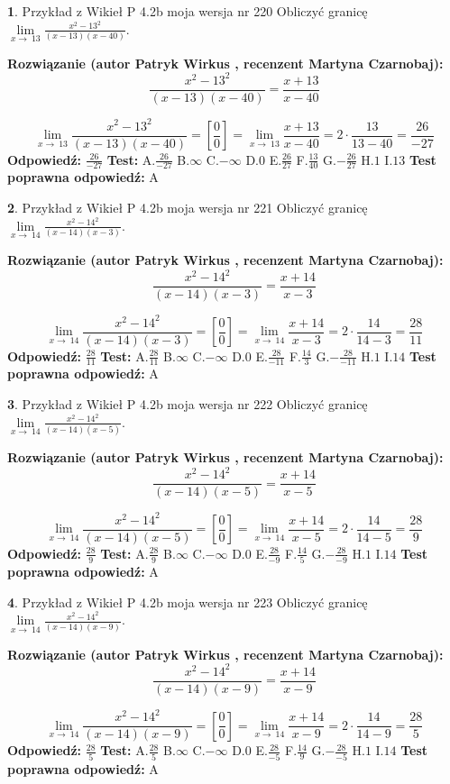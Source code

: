 \documentclass[12pt, a4paper]{article}
\theoremstyle{definition} %
\newtheorem{zad}{}
\newcommand{\zadStart}[1]{\begin{zad}#1\newline}
\newcommand{\zadStop}{\end{zad}}
\newcommand{\rozwStart}[2]{\noindent \textbf{Rozwiązanie (autor #1 , recenzent #2): }\newline}
\newcommand{\rozwStop}{\newline}
\newcommand{\odpStart}{\noindent \textbf{Odpowiedź:}\newline}
\newcommand{\odpStop}{\newline}
\newcommand{\testStart}{\noindent \textbf{Test:}\newline}
\newcommand{\testStop}{\newline}
\newcommand{\kluczStart}{\noindent \textbf{Test poprawna odpowiedź:}\newline}
\newcommand{\kluczStop}{\newline}
\begin{document}
\zadStart{Przykład z Wikieł P 4.2b moja wersja nr 220}
Obliczyć granicę $\lim\limits_{x\to\ 13}\frac{x^{2}-13^{2}}{(x-13)(x-40)}$.
\zadStop
\rozwStart{Patryk Wirkus}{Martyna Czarnobaj}
$$\frac{x^{2}-13^{2}}{(x-13)(x-40)}=\frac{x+13}{x-40}$$

$$\lim\limits_{x\to\ 13}\frac{x^{2}-13^{2}}{(x-13)(x-40)}=[\frac{0}{0}]=\lim\limits_{x\to\ 13}\frac{x+13}{x-40}=2 \cdot \frac{13}{13-40} = \frac{26}{-27}$$
\rozwStop
\odpStart
$\frac{26}{-27}$
\odpStop
\testStart
A.$\frac{26}{-27}$
B.$\infty$
C.$-\infty$
D.$0$
E.$\frac{26}{27}$
F.$\frac{13}{40}$
G.$-\frac{26}{27}$
H.$1$
I.$13$
\testStop
\kluczStart
A
\kluczStop



\zadStart{Przykład z Wikieł P 4.2b moja wersja nr 221}
Obliczyć granicę $\lim\limits_{x\to\ 14}\frac{x^{2}-14^{2}}{(x-14)(x-3)}$.
\zadStop
\rozwStart{Patryk Wirkus}{Martyna Czarnobaj}
$$\frac{x^{2}-14^{2}}{(x-14)(x-3)}=\frac{x+14}{x-3}$$

$$\lim\limits_{x\to\ 14}\frac{x^{2}-14^{2}}{(x-14)(x-3)}=[\frac{0}{0}]=\lim\limits_{x\to\ 14}\frac{x+14}{x-3}=2 \cdot \frac{14}{14-3} = \frac{28}{11}$$
\rozwStop
\odpStart
$\frac{28}{11}$
\odpStop
\testStart
A.$\frac{28}{11}$
B.$\infty$
C.$-\infty$
D.$0$
E.$\frac{28}{-11}$
F.$\frac{14}{3}$
G.$-\frac{28}{-11}$
H.$1$
I.$14$
\testStop
\kluczStart
A
\kluczStop



\zadStart{Przykład z Wikieł P 4.2b moja wersja nr 222}
Obliczyć granicę $\lim\limits_{x\to\ 14}\frac{x^{2}-14^{2}}{(x-14)(x-5)}$.
\zadStop
\rozwStart{Patryk Wirkus}{Martyna Czarnobaj}
$$\frac{x^{2}-14^{2}}{(x-14)(x-5)}=\frac{x+14}{x-5}$$

$$\lim\limits_{x\to\ 14}\frac{x^{2}-14^{2}}{(x-14)(x-5)}=[\frac{0}{0}]=\lim\limits_{x\to\ 14}\frac{x+14}{x-5}=2 \cdot \frac{14}{14-5} = \frac{28}{9}$$
\rozwStop
\odpStart
$\frac{28}{9}$
\odpStop
\testStart
A.$\frac{28}{9}$
B.$\infty$
C.$-\infty$
D.$0$
E.$\frac{28}{-9}$
F.$\frac{14}{5}$
G.$-\frac{28}{-9}$
H.$1$
I.$14$
\testStop
\kluczStart
A
\kluczStop



\zadStart{Przykład z Wikieł P 4.2b moja wersja nr 223}
Obliczyć granicę $\lim\limits_{x\to\ 14}\frac{x^{2}-14^{2}}{(x-14)(x-9)}$.
\zadStop
\rozwStart{Patryk Wirkus}{Martyna Czarnobaj}
$$\frac{x^{2}-14^{2}}{(x-14)(x-9)}=\frac{x+14}{x-9}$$

$$\lim\limits_{x\to\ 14}\frac{x^{2}-14^{2}}{(x-14)(x-9)}=[\frac{0}{0}]=\lim\limits_{x\to\ 14}\frac{x+14}{x-9}=2 \cdot \frac{14}{14-9} = \frac{28}{5}$$
\rozwStop
\odpStart
$\frac{28}{5}$
\odpStop
\testStart
A.$\frac{28}{5}$
B.$\infty$
C.$-\infty$
D.$0$
E.$\frac{28}{-5}$
F.$\frac{14}{9}$
G.$-\frac{28}{-5}$
H.$1$
I.$14$
\testStop
\kluczStart
A
\kluczStop
\end{document}
